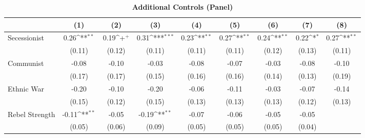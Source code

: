 \documentclass[12pt, letterpaper]{article}
\begin{document}
\newpage
\begin{table}[htbp]\centering
\begin{small}
\def\sym#1{\ifmmode^{#1}\else\(^{#1}\)\fi}
\renewcommand\thetable{A.\Roman{table}}
\makeatletter
\def\myrow{}
\CT@everycr{\noalign{%
\global\let\CT@row@color\relax
\stepcounter{mym15}%
\ifnum\value{mym15}=2
  \gdef\myrow{\rowcolor{gray!50}}
\else\ifnum\value{mym15}=4
  \gdef\myrow{}
\fi\fi
}\myrow}
\caption{\textbf{Additional Controls (Panel)}}
\label{table:addcontrolsp}
\begin{tabular}{l*{8}{c}}
\hline\hline
                    &\multicolumn{1}{c}{(1)}&\multicolumn{1}{c}{(2)}&\multicolumn{1}{c}{(3)}&\multicolumn{1}{c}{(4)}&\multicolumn{1}{c}{(5)}&\multicolumn{1}{c}{(6)}&\multicolumn{1}{c}{(7)}&\multicolumn{1}{c}{(8)}\\
\hline
Secessionist      &        0.26\sym{**} &        0.19\sym{+}  &        0.31\sym{***}&        0.23\sym{**} &        0.27\sym{**} &        0.24\sym{**} &        0.22\sym{*}  &        0.27\sym{**} \\
                    &      (0.11)         &      (0.12)         &      (0.11)         &      (0.11)         &      (0.11)         &      (0.12)         &      (0.13)         &      (0.11)         \\
Communist           &       -0.08         &       -0.10         &       -0.03         &       -0.08         &       -0.07         &       -0.03         &       -0.08         &       -0.10         \\
                    &      (0.17)         &      (0.17)         &      (0.15)         &      (0.16)         &      (0.16)         &      (0.14)         &      (0.13)         &      (0.19)         \\
Ethnic War          &       -0.20         &       -0.10         &       -0.20         &       -0.06         &       -0.11         &       -0.03         &       -0.07         &       -0.14         \\
                    &      (0.15)         &      (0.12)         &      (0.15)         &      (0.13)         &      (0.13)         &      (0.13)         &      (0.12)         &      (0.13)         \\
Rebel Strength      &       -0.11\sym{**} &       -0.05         &       -0.19\sym{**} &       -0.07         &       -0.06         &       -0.05         &       -0.05         &                     \\
                    &      (0.05)         &      (0.06)         &      (0.09)         &      (0.05)         &      (0.05)         &      (0.05)         &      (0.04)         &                     \\

\end{tabular}
\end{small}
\end{table}
\end{document}
